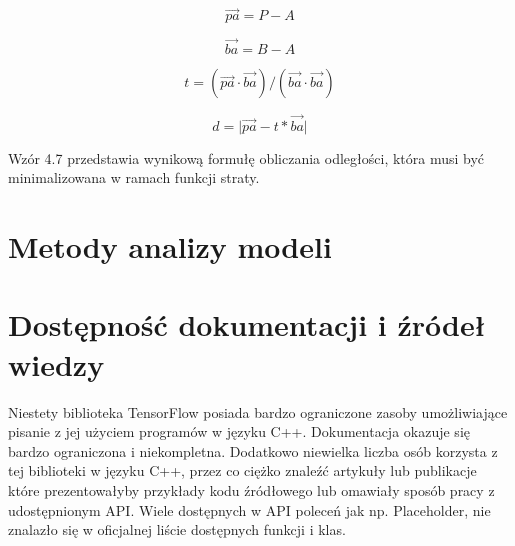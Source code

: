 \begin{equation}
	\overrightarrow{pa} = P - A
\end{equation}

\begin{equation}
	\overrightarrow{ba} = B - A
\end{equation}

\begin{equation}
	t = (\overrightarrow{pa} \cdot \overrightarrow{ba}) / (\overrightarrow{ba} \cdot \overrightarrow{ba})
\end{equation}

\begin{equation}
	d = \lvert \overrightarrow{pa} - t * \overrightarrow{ba} \rvert
\end{equation}

Wzór 4.7 przedstawia wynikową formułę obliczania odległości, która musi być minimalizowana w ramach funkcji straty.

\section{Metody analizy modeli}
\section{Dostępność dokumentacji i źródeł wiedzy}

Niestety biblioteka TensorFlow posiada bardzo ograniczone zasoby umożliwiające pisanie z jej użyciem programów w języku C++. Dokumentacja okazuje się bardzo ograniczona i niekompletna. Dodatkowo niewielka liczba osób korzysta z tej biblioteki w języku C++, przez co ciężko znaleźć artykuły lub publikacje które prezentowałyby przykłady kodu źródłowego lub omawiały sposób pracy z udostępnionym API. Wiele dostępnych w API poleceń jak np. Placeholder, nie znalazło się w oficjalnej liście dostępnych funkcji i klas.